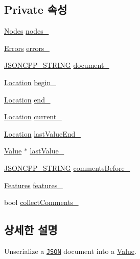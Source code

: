 \subsection*{Private 속성}
\begin{DoxyCompactItemize}
\item 
\hyperlink{class_json_1_1_reader_a8da2114fe8b8124d41ea2f3434f0171b}{Nodes} \hyperlink{class_json_1_1_reader_ada3d2c47699dad662e6d156c8c78a6ac}{nodes\+\_\+}
\item 
\hyperlink{class_json_1_1_reader_aae51e8f5bab3f067261c842a3ef858e5}{Errors} \hyperlink{class_json_1_1_reader_a1bbce45dc4df753bed60c129f4b5147c}{errors\+\_\+}
\item 
\hyperlink{json_8h_a1e723f95759de062585bc4a8fd3fa4be}{J\+S\+O\+N\+C\+P\+P\+\_\+\+S\+T\+R\+I\+NG} \hyperlink{class_json_1_1_reader_abf99e137bc92a93623dc97598702261a}{document\+\_\+}
\item 
\hyperlink{class_json_1_1_reader_a46795b5b272bf79a7730e406cb96375a}{Location} \hyperlink{class_json_1_1_reader_a327166839022ea91f0a8290960a8af76}{begin\+\_\+}
\item 
\hyperlink{class_json_1_1_reader_a46795b5b272bf79a7730e406cb96375a}{Location} \hyperlink{class_json_1_1_reader_a714793579cbf4ee7c5a7223d2c8d77c1}{end\+\_\+}
\item 
\hyperlink{class_json_1_1_reader_a46795b5b272bf79a7730e406cb96375a}{Location} \hyperlink{class_json_1_1_reader_a2f2feb5201a26da7aa133d2f7434479b}{current\+\_\+}
\item 
\hyperlink{class_json_1_1_reader_a46795b5b272bf79a7730e406cb96375a}{Location} \hyperlink{class_json_1_1_reader_a497a114f7b760f1b794b8fff9876615a}{last\+Value\+End\+\_\+}
\item 
\hyperlink{class_json_1_1_value}{Value} $\ast$ \hyperlink{class_json_1_1_reader_a87cc75ae5adc6a6755f0ba1c7255ff6c}{last\+Value\+\_\+}
\item 
\hyperlink{json_8h_a1e723f95759de062585bc4a8fd3fa4be}{J\+S\+O\+N\+C\+P\+P\+\_\+\+S\+T\+R\+I\+NG} \hyperlink{class_json_1_1_reader_af777967adaf0b2e882efa07673754381}{comments\+Before\+\_\+}
\item 
\hyperlink{class_json_1_1_features}{Features} \hyperlink{class_json_1_1_reader_aa9984ff8f519b5541346157b7aebf97b}{features\+\_\+}
\item 
bool \hyperlink{class_json_1_1_reader_a8e9ce743f6004f0596692f0a9ee4626c}{collect\+Comments\+\_\+}
\end{DoxyCompactItemize}


\subsection{상세한 설명}
Unserialize a \href{http://www.json.org}{\tt J\+S\+ON} document into a \hyperlink{class_json_1_1_value}{Value}. 

